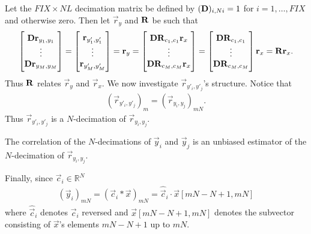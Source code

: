 \documentclass[a4paper, openany, oneside]{memoir}
\begin{document}
Let the $FIX\times NL$ decimation matrix be defined by $(\boldsymbol{\mathbf{D}})_{i,Ni} = 1$ for $i=1,\ldots,FIX$ and otherwise zero. Then let $\vec{r}_y$ and $\boldsymbol{\mathbf{R}}$ be such that
\begin{align*}
    \begin{bmatrix}
        \boldsymbol{\mathbf{D}}\boldsymbol{\mathbf{r}}_{y_1,y_1} \\
        \vdots \\
        \boldsymbol{\mathbf{D}}\boldsymbol{\mathbf{r}}_{y_M,y_M}
    \end{bmatrix}
    = \begin{bmatrix}
        \boldsymbol{\mathbf{r}}_{y'_1,y'_1} \\
        \vdots \\
        \boldsymbol{\mathbf{r}}_{y'_M,y'_M}
    \end{bmatrix}
    = \boldsymbol{\mathbf{r}}_y
    = \begin{bmatrix}
        \boldsymbol{\mathbf{D}}\boldsymbol{\mathbf{R}}_{c_1,c_1} \boldsymbol{\mathbf{r}}_x \\
        \vdots \\
        \boldsymbol{\mathbf{D}}\boldsymbol{\mathbf{R}}_{c_M,c_M} \boldsymbol{\mathbf{r}}_x
    \end{bmatrix}
    = \begin{bmatrix}
        \boldsymbol{\mathbf{D}}\boldsymbol{\mathbf{R}}_{c_1,c_1}\\
        \vdots \\
        \boldsymbol{\mathbf{D}}\boldsymbol{\mathbf{R}}_{c_M,c_M}
    \end{bmatrix} \boldsymbol{\mathbf{r}}_x
    = \boldsymbol{\mathbf{R}} \boldsymbol{\mathbf{r}}_x.
\end{align*}
Thus $\boldsymbol{\mathbf{R}}$ relates $\vec{r}_y$ and $\vec{r}_x$. We now investigate $\vec{r}_{y'_i,y'_j}$'s structure. Notice that
\begin{align*}
    (\vec{r}_{y'_i,y'_j})_m = (\vec{r}_{y_i,y_j})_{mN}.
\end{align*}
Thus $\vec{r}_{y'_i,y'_j}$ is a $N$-decimation of $\vec{r}_{y_i,y_j}$.
\begin{theorem} \label{th:deci-corr}
   The correlation of the $N$-decimations of $\vec{y}_i$ and $\vec{y}_j$ is an unbiased estimator of the $N$-decimation of $\vec{r}_{y_i,y_j}$.
\end{theorem}
Finally, since $\vec{c}_i \in \mathbb{R}^N$
\begin{align*}
    (\vec{y}_i)_{mN} = (\vec{c}_i \ast \vec{x})_{mN} = \hat{\vec{c}}_i \cdot \vec{x}[mN-N+1,mN]
\end{align*}
where $\hat{\vec{c}}_i$ denotes $\vec{c}_i$ reversed and $\vec{x}[mN-N+1,mN]$ denotes the subvector consisting of $\vec{x}$'s elements $mN-N+1$ up to $mN$.
\end{document}
